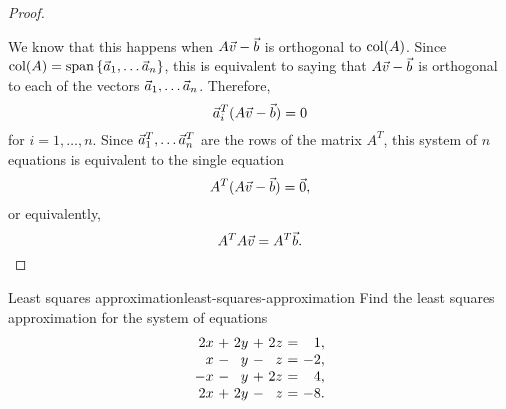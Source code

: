 \documentclass{ximera}
\begin{document}
\begin{proof}
\begin{center}
  \end{center}
  We know that this
  happens when $A\vec{v}-\vec{b}$ is orthogonal to $\text{col}(A)$. Since
  $\text{col}(A)=\text{span}\left\{\vec{a}_1,\ldots\vec{a}_n\right\}$, this is
  equivalent to saying that $A\vec{v}-\vec{b}$ is orthogonal to each of
  the vectors $\vec{a}_1,\ldots\vec{a}_n$. Therefore,
  \begin{equation*}
    \vec{a}_i^T(A\vec{v}-\vec{b})=0
  \end{equation*}
  for $i=1,\ldots,n$. Since $\vec{a}_1^T,\ldots\vec{a}_n^T$ are the
  rows of the matrix $A^T$, this system of $n$ equations is equivalent
  to the single equation
  \begin{equation*}
    A^T(A\vec{v}-\vec{b})=\vec{0},
  \end{equation*}
  or equivalently,
  \begin{equation*}
    A^TA\vec{v} = A^T\vec{b}.
  \end{equation*}
\end{proof}

\begin{example}{Least squares approximation}{least-squares-approximation}
  Find the least squares approximation for the system of equations
  \begin{equation*}
    \begin{array}{r@{~}c@{~}r@{~}c@{~}r@{~}c@{~}r}
      2x &+& 2y &+& 2z &=&  1, \\
      x  &-&  y &-&  z &=& -2, \\
      -x &-&  y &+& 2z &=&  4, \\
      2x &+& 2y &-&  z &=& -8. \\
    \end{array}
  \end{equation*}
\end{example}
\end{document}
